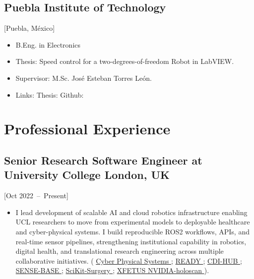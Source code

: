 \documentclass{mycv}
\begin{document}
\subsection{Puebla Institute of Technology}[Puebla, M\'exico]
\begin{itemize}[label={}]
  \item B.Eng. in Electronics 
  \item Thesis: Speed control for a two-degrees-of-freedom Robot in LabVIEW.
  \item Supervisor: M.Sc. Jos\'e Esteban Torres Le\'on.
  \item	Links: Thesis: \href{https://github.com/mxochicale/publications/blob/master/thesis/B.Eng./doc/MPXochicale_BachelorEngThesis-2003.pdf}{\faFilePdf} Github: \href{https://github.com/mxochicale/publications/tree/master/thesis/B.Eng.}{\faGithub*}
\end{itemize}

\section{Professional Experience}

\subsection{Senior Research Software Engineer at University College London, UK}[Oct 2022~--~Present]
\begin{itemize}
  \item 
I lead development of scalable AI and cloud robotics infrastructure enabling UCL researchers to move from experimental models to deployable healthcare and cyber-physical systems. 
I build reproducible ROS2 workflows, APIs, and real-time sensor pipelines, strengthening institutional capability in robotics, digital health, and translational research engineering across multiple collaborative initiatives.
(
\href{https://github.com/UCL-CyberPhysicalSystems/hackathon-01}{Cyber Physical Systems \faGithub*};
\href{https://github.com/oocular/ready}{READY \faGithub*};
\href{https://github.com/UCL-CDI/cdi-hub}{CDI-HUB \faGithub*};
\href{https://github.com/sense-base}{SENSE-BASE \faGithub*};
\href{https://github.com/SciKit-Surgery}{SciKit-Surgery \faGithub*};
\href{https://github.com/xfetus/xfetus}{XFETUS \faGithub*}
\href{https://mxochicale.github.io/real-time-ai-for-surgery-with-NVIDIA-Holoscan-platform/#/section}{NVIDIA-holoscan \faExternalLink*}
).
\end{itemize}
\end{document}
